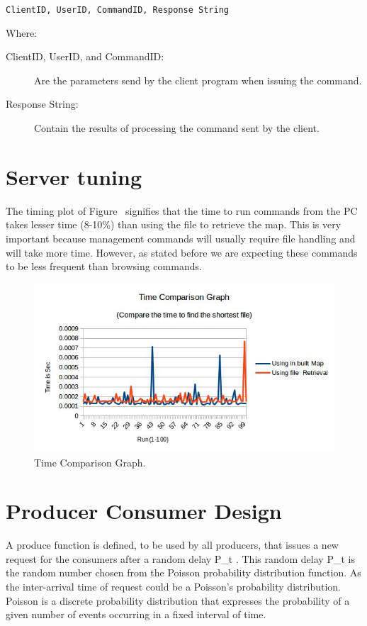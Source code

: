 \documentclass[10pt]{article}
\begin{document}
\texttt{ClientID, UserID, CommandID, Response String}

Where:

\begin{description}
\item [{ClientID, UserID, and CommandID:}] Are the parameters send by the client
  program when issuing the command.
\item [{Response String:}] Contain the results of processing the command sent by
  the client.
\end{description}

\section{Server tuning}

The timing plot of Figure~ signifies that the time to run commands from the PC
takes lesser time (8-10\%) than using the file to retrieve the map. This is very
important because management commands will usually require file handling and
will take more time. However, as stated before we are expecting these commands
to be less frequent than browsing commands.
\begin{figure}[h]
\centering
\caption{Time Comparison Graph.\label{fig:TimmingPlot}}
\includegraphics [width=15cm]{Time.jpg}
\end{figure}

\section{Producer Consumer Design}
A produce function is defined, to be used by all producers, that issues a new request for the consumers after a random delay P\_t . This random delay P\_t is the random number chosen from the Poisson probability distribution function. As the inter-arrival time of request could be a Poisson's probability distribution. Poisson is a discrete probability distribution that expresses the probability of a given number of events occurring in a fixed interval of time.
\end{document}
